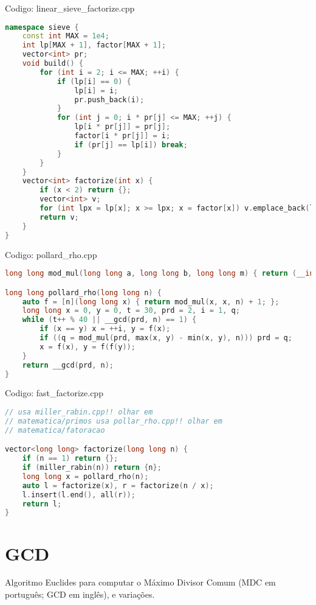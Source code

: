 \documentclass[10pt, a4paper, oneside]{book}
\begin{document}
Codigo: linear\_sieve\_factorize.cpp

\begin{lstlisting}[language=C++]
namespace sieve {
    const int MAX = 1e4;
    int lp[MAX + 1], factor[MAX + 1];
    vector<int> pr;
    void build() {
        for (int i = 2; i <= MAX; ++i) {
            if (lp[i] == 0) {
                lp[i] = i;
                pr.push_back(i);
            }
            for (int j = 0; i * pr[j] <= MAX; ++j) {
                lp[i * pr[j]] = pr[j];
                factor[i * pr[j]] = i;
                if (pr[j] == lp[i]) break;
            }
        }
    }
    vector<int> factorize(int x) {
        if (x < 2) return {};
        vector<int> v;
        for (int lpx = lp[x]; x >= lpx; x = factor[x]) v.emplace_back(lp[x]);
        return v;
    }
}
\end{lstlisting}
\hfill

Codigo: pollard\_rho.cpp

\begin{lstlisting}[language=C++]
long long mod_mul(long long a, long long b, long long m) { return (__int128)a * b % m; }

long long pollard_rho(long long n) {
    auto f = [n](long long x) { return mod_mul(x, x, n) + 1; };
    long long x = 0, y = 0, t = 30, prd = 2, i = 1, q;
    while (t++ % 40 || __gcd(prd, n) == 1) {
        if (x == y) x = ++i, y = f(x);
        if ((q = mod_mul(prd, max(x, y) - min(x, y), n))) prd = q;
        x = f(x), y = f(f(y));
    }
    return __gcd(prd, n);
}
\end{lstlisting}
\hfill

Codigo: fast\_factorize.cpp

\begin{lstlisting}[language=C++]
// usa miller_rabin.cpp!! olhar em
// matematica/primos usa pollar_rho.cpp!! olhar em
// matematica/fatoracao

vector<long long> factorize(long long n) {
    if (n == 1) return {};
    if (miller_rabin(n)) return {n};
    long long x = pollard_rho(n);
    auto l = factorize(x), r = factorize(n / x);
    l.insert(l.end(), all(r));
    return l;
}
\end{lstlisting}
\hfill

\section{GCD}


Algoritmo Euclides para computar o Máximo Divisor Comum (MDC em português; GCD em inglês), e variações.
\end{document}
